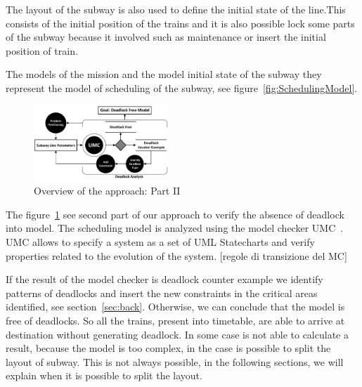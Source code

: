 
The layout of the subway is also used to define the initial state of the line.This consists of the initial position of the trains and it is also possible lock some parts of the subway because it involved such as maintenance or insert the initial position of train.


The models of the mission and the model initial state of the subway they represent the model of scheduling of the subway, see figure~\ref{fig:SchedulingModel}.


\begin{figure}[h!]
	\begin{centering}	
	\includegraphics[width=0.45\textwidth, clip]{img/processo2}
	\caption{Overview of the approach: Part II}
	\label{fig:process2}
	\end{centering}
\end{figure}

The figure~\ref{fig:process2} see second part of our approach to verify the absence of deadlock into model. 
The scheduling model is analyzed using the model checker UMC~\cite{mazzanti2010}.
UMC allows to specify a system as a set of UML Statecharts and verify properties related to the evolution of the system.
[regole di transizione del MC]

If the result of the model checker is deadlock counter example we identify patterns of deadlocks and insert the new constraints in the critical areas identified, see section~\ref{sec:back}. Otherwise, we can conclude that the model is free of deadlocks. 
So all the trains, present into timetable, are able to arrive at destination without generating deadlock.
In some case is not able to calculate a result, because the model is too complex, in the case is  possible to split the layout of subway. This is not always possible, in the following sections, we will explain when it is possible to split the layout.
